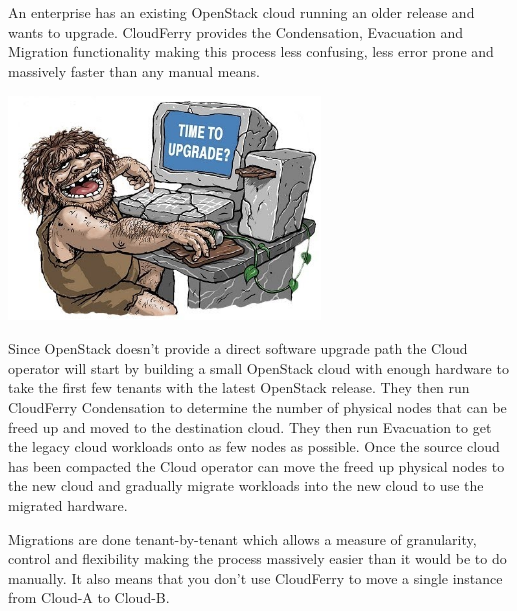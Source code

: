 \documentclass{article}
\begin{document}
\vspace{2pt}
{\color{color03} An enterprise has an existing OpenStack cloud running an older 
release and wants to upgrade. CloudFerry provides the Condensation, Evacuation 
and Migration functionality making this process less confusing, less error prone 
and massively faster than any manual means.}

\vspace{24pt}
\begin{center}
\includegraphics[width=235pt, height=169pt, keepaspectratio=true]{images/CloudFerry_Brochure-fig008.jpg}

\end{center}

\vspace{24pt}
\baselineskip=12pt

{\color{color03} Since OpenStack doesn't provide a direct software upgrade path 
the Cloud operator will start by building a small OpenStack cloud with enough hardware 
to take the first few tenants with the latest OpenStack release. They then run 
CloudFerry Condensation to determine the number of physical nodes that can be freed 
up and moved to the destination cloud. They then run Evacuation to get the legacy 
cloud workloads onto as few nodes as possible. Once the source cloud has been compacted 
the Cloud operator can move the freed up physical nodes to the new cloud and gradually 
migrate workloads into the new cloud to use the migrated hardware. }

\vspace{2pt}
{\color{color03} Migrations are done tenant-by-tenant which allows a measure of 
granularity, control and flexibility making the process massively easier than it 
would be to do manually. It also means that you don't use CloudFerry to move a 
single instance from Cloud-A to Cloud-B. }
\end{document}
